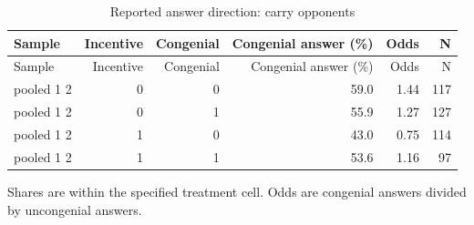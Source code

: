 
\begin{longtable}[t]{lrrrrr}
\caption{\label{tab:demand_opp}Reported answer direction: carry opponents}\\
\toprule
Sample & Incentive & Congenial & Congenial answer (\%) & Odds & N\\
\midrule
\endfirsthead
\toprule
Sample & Incentive & Congenial & Congenial answer (\%) & Odds & N\\
\midrule
\endhead
pooled 1 2 & 0 & 0 & 59.0 & 1.44 & 117\\
pooled 1 2 & 0 & 1 & 55.9 & 1.27 & 127\\
pooled 1 2 & 1 & 0 & 43.0 & 0.75 & 114\\
pooled 1 2 & 1 & 1 & 53.6 & 1.16 & 97\\
\bottomrule
\end{longtable}
\noindent\footnotesize Shares are within the specified treatment cell. Odds are congenial answers divided by uncongenial answers.\par\normalsize

